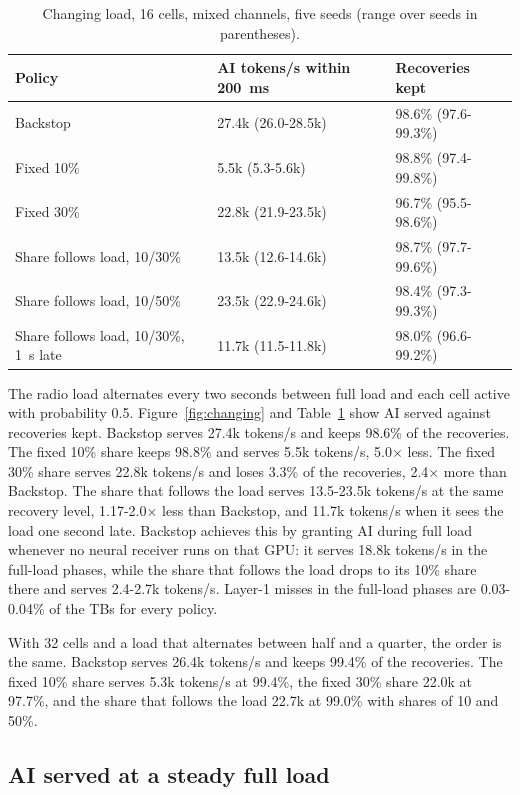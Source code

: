 \documentclass[acmsmall,screen,review,anonymous]{acmart}
\newcommand{\sys}{Backstop\xspace}
\begin{document}
\begin{table}[t]
\caption{Changing load, 16 cells, mixed channels, five seeds (range over seeds in parentheses).}
\label{tab:changing}
\footnotesize
\begin{tabular}{@{}lll@{}}
\toprule
Policy & AI tokens/s within 200~ms & Recoveries kept \\
\midrule
\sys & 27.4k (26.0-28.5k) & 98.6\% (97.6-99.3\%) \\
Fixed 10\% & 5.5k (5.3-5.6k) & 98.8\% (97.4-99.8\%) \\
Fixed 30\% & 22.8k (21.9-23.5k) & 96.7\% (95.5-98.6\%) \\
Share follows load, 10/30\% & 13.5k (12.6-14.6k) & 98.7\% (97.7-99.6\%) \\
Share follows load, 10/50\% & 23.5k (22.9-24.6k) & 98.4\% (97.3-99.3\%) \\
Share follows load, 10/30\%, 1~s late & 11.7k (11.5-11.8k) & 98.0\% (96.6-99.2\%) \\
\bottomrule
\end{tabular}
\end{table}

The radio load alternates every two seconds between full load and each cell active with probability 0.5.
Figure~\ref{fig:changing} and Table~\ref{tab:changing} show AI served against recoveries kept. \sys serves
27.4k tokens/s and keeps 98.6\% of the recoveries. The fixed 10\% share keeps 98.8\% and serves 5.5k
tokens/s, 5.0$\times$ less. The fixed 30\% share serves 22.8k tokens/s and loses 3.3\% of the recoveries,
2.4$\times$ more than \sys. The share that follows the load serves 13.5-23.5k tokens/s at the same recovery
level, 1.17-2.0$\times$ less than \sys, and 11.7k tokens/s when it sees the load one second late. \sys
achieves this by granting AI during full load whenever no neural receiver runs on that GPU: it serves 18.8k
tokens/s in the full-load phases, while the share that follows the load drops to its 10\% share there and
serves 2.4-2.7k tokens/s. Layer-1 misses in the full-load phases are 0.03-0.04\% of the TBs for every
policy.

With 32 cells and a load that alternates between half and a quarter, the order is the same. \sys serves
26.4k tokens/s and keeps 99.4\% of the recoveries. The fixed 10\% share serves 5.3k tokens/s at 99.4\%, the
fixed 30\% share 22.0k at 97.7\%, and the share that follows the load 22.7k at 99.0\% with shares of 10 and
50\%.

\subsection{AI served at a steady full load}
\end{document}
